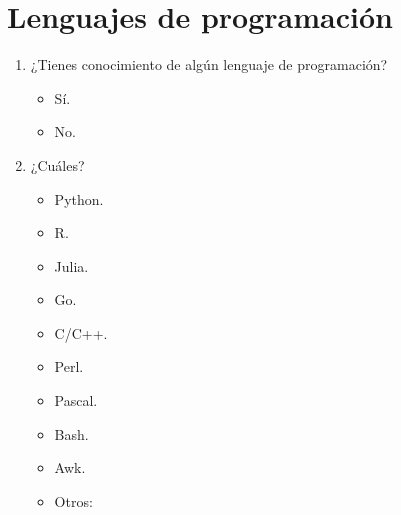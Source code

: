 \documentclass[a4paper,12pt]{article}
\newcounter{preg}[section]
\begin{document}
\section{Lenguajes de programación}
\begin{enumerate}
\item {} ¿Tienes conocimiento de algún lenguaje de programación?
   \begin{itemize}
   \item Sí.
   \item No.
   \end{itemize}

\item ¿Cuáles?
   \begin{itemize}
   \item Python.
   \item R.
   \item Julia.
   \item Go.
   \item C/C++.
   \item Perl.
   \item Pascal.
   \item Bash.
   \item Awk.
   \item Otros:
   \end{itemize}
\end{enumerate}
\end{document}
